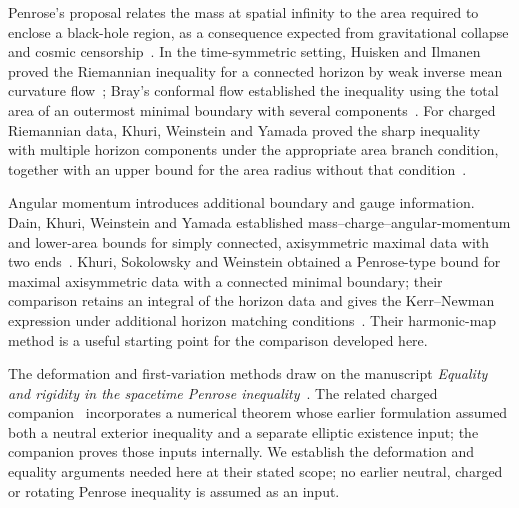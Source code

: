 Penrose's proposal relates the mass at spatial infinity to the area
required to enclose a black-hole region, as a consequence expected from
gravitational collapse and cosmic censorship~\cite{Penrose1973}.
In the time-symmetric setting, Huisken and Ilmanen proved the Riemannian
inequality for a connected horizon by weak inverse mean curvature
flow~\cite{HuiskenIlmanen2001}; Bray's conformal flow established the
inequality using the total area of an outermost minimal boundary with
several components~\cite{Bray2001}.
For charged Riemannian data, Khuri, Weinstein and Yamada proved the sharp
inequality with multiple horizon components under the appropriate area
branch condition, together with an upper bound for the area radius
without that condition~\cite{KhuriWeinsteinYamada2017}.

Angular momentum introduces additional boundary and gauge information.
Dain, Khuri, Weinstein and Yamada established mass--charge--angular-momentum
and lower-area bounds for simply connected, axisymmetric maximal data
with two ends~\cite{DainKhuriWeinsteinYamada2013}.
Khuri, Sokolowsky and Weinstein obtained a Penrose-type bound for maximal
axisymmetric data with a connected minimal boundary; their comparison
retains an integral of the horizon data and gives the Kerr--Newman
expression under additional horizon matching
conditions~\cite{KhuriSokolowskyWeinstein2019}.
Their harmonic-map method is a useful starting point for the comparison
developed here.

The deformation and first-variation methods draw on the manuscript
\emph{Equality and rigidity in the spacetime Penrose inequality}~\cite{NeutralExterior2026}.
The related charged companion~\cite{ConditionalCharged2026} incorporates
a numerical theorem whose earlier formulation assumed both a neutral
exterior inequality and a separate elliptic existence input; the companion
proves those inputs internally.
We establish the deformation and equality arguments needed here at
their stated scope; no earlier neutral, charged or rotating Penrose
inequality is assumed as an input.
